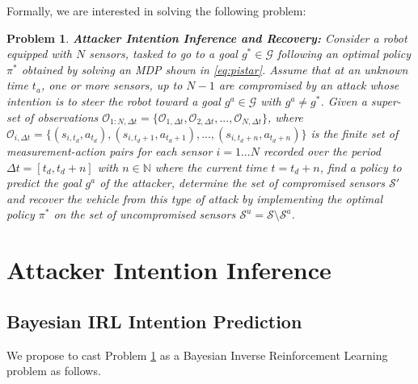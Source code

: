 \documentclass[letterpaper, 10 pt, conference]{ieeeconf}  %
\newcommand{\Ne}{\mathbb {N}}
\newtheorem{problem}{Problem}
\newcommand\NB[1]{$\spadesuit$\footnote{NB: #1}}
\begin{document}
Formally, we are interested in solving the following problem:
\begin{problem}\label{prob:p1}
{ \bf Attacker Intention Inference and Recovery:} Consider a robot equipped with $N$ sensors, tasked to go to a goal $g^* \in \mathcal G$ following an optimal policy $\pi^*$ obtained by solving an MDP shown in \eqref{eq:pistar}. Assume that at an unknown time $t_a$, one or more sensors, up to $N-1$ are compromised by an attack whose intention is to steer the robot toward a goal $g^a \in \mathcal G$ with $g^a \neq g^*$. Given a super-set of observations $\mathcal{O}_{1:N,\Delta t} = \{\mathcal{O}_{1,\Delta t}, \mathcal{O}_{2,\Delta t}, ..., \mathcal{O}_{N,\Delta t}\}$, where $\mathcal{O}_{i,\Delta t} = \{(s_{i,t_d}, a_{t_d}), (s_{i,t_d+1}, a_{t_d+1}), ..., (s_{i,t_d+n}, a_{t_d+n})\}$ is the finite set of measurement-action pairs for each sensor $i=1 \ldots N$ recorded over the period $\Delta t = [t_d, t_d+n ]$ with $n \in \Ne$ where the current time $t=t_d+n$, find a policy to predict the goal $g^a$ of the attacker, determine the set of compromised sensors $\mathcal{S}'$ and recover the vehicle from this type of attack by implementing the optimal policy $\pi^*$ on the set of uncompromised sensors $\mathcal S^u = \mathcal S \setminus \mathcal{S}^a$.


\end{problem}

\section{Attacker Intention Inference}\label{sec:approach}
\subsection{Bayesian IRL Intention Prediction}\label{sec:approach1}
We propose to cast Problem \ref{prob:p1} as a Bayesian Inverse Reinforcement Learning problem as follows. 
\end{document}
